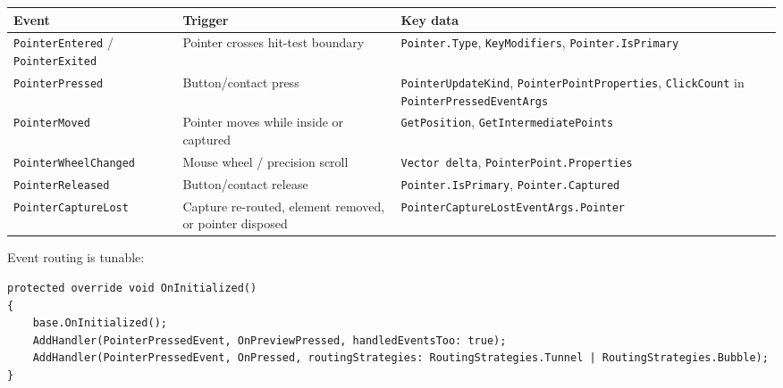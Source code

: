 \begin{longtable}[]{@{}
  >{\raggedright\arraybackslash}p{}
  >{\raggedright\arraybackslash}p{}
  >{\raggedright\arraybackslash}p{}@{}}
\toprule\noalign{}
\begin{minipage}[b]{\linewidth}\raggedright
Event
\end{minipage} & \begin{minipage}[b]{\linewidth}\raggedright
Trigger
\end{minipage} & \begin{minipage}[b]{\linewidth}\raggedright
Key data
\end{minipage} \\
\midrule\noalign{}
\endhead
\bottomrule\noalign{}
\endlastfoot
\passthrough{\lstinline!PointerEntered!} /
\passthrough{\lstinline!PointerExited!} & Pointer crosses hit-test
boundary & \passthrough{\lstinline!Pointer.Type!},
\passthrough{\lstinline!KeyModifiers!},
\passthrough{\lstinline!Pointer.IsPrimary!} \\
\passthrough{\lstinline!PointerPressed!} & Button/contact press &
\passthrough{\lstinline!PointerUpdateKind!},
\passthrough{\lstinline!PointerPointProperties!},
\passthrough{\lstinline!ClickCount!} in
\passthrough{\lstinline!PointerPressedEventArgs!} \\
\passthrough{\lstinline!PointerMoved!} & Pointer moves while inside or
captured & \passthrough{\lstinline!GetPosition!},
\passthrough{\lstinline!GetIntermediatePoints!} \\
\passthrough{\lstinline!PointerWheelChanged!} & Mouse wheel / precision
scroll & \passthrough{\lstinline!Vector delta!},
\passthrough{\lstinline!PointerPoint.Properties!} \\
\passthrough{\lstinline!PointerReleased!} & Button/contact release &
\passthrough{\lstinline!Pointer.IsPrimary!},
\passthrough{\lstinline!Pointer.Captured!} \\
\passthrough{\lstinline!PointerCaptureLost!} & Capture re-routed,
element removed, or pointer disposed &
\passthrough{\lstinline!PointerCaptureLostEventArgs.Pointer!} \\
\end{longtable}

Event routing is tunable:

\begin{lstlisting}
protected override void OnInitialized()
{
    base.OnInitialized();
    AddHandler(PointerPressedEvent, OnPreviewPressed, handledEventsToo: true);
    AddHandler(PointerPressedEvent, OnPressed, routingStrategies: RoutingStrategies.Tunnel | RoutingStrategies.Bubble);
}
\end{lstlisting}

